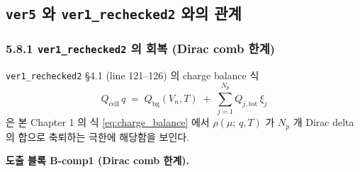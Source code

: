 \documentclass[11pt,a4paper]{article}
\newcommand{\tot}{\mathrm{tot}}
\newcommand{\bg}{\mathrm{bg}}
\newcommand{\cell}{\mathrm{cell}}
\newcommand{\mucont}{\mu}
\newcommand{\rhomu}{\rho(\mucont;\, q, T)}
\begin{document}
\subsection{\texttt{ver5} 와 \texttt{ver1\_rechecked2} 와의 관계}
\label{sec:legacy_comparison}

\subsubsection*{5.8.1 \texttt{ver1\_rechecked2} 의 회복 (Dirac comb 한계)}

\texttt{ver1\_rechecked2} \S 4.1 (line 121--126) 의 charge balance 식
\begin{equation}
Q_{\cell}\, q
\;=\;
Q_{\bg}(V_n, T)
\;+\;
\sum_{j=1}^{N_p} Q_{j,\tot}\, \xi_j
\label{eq:rechecked2_cb}
\end{equation}
은 본 Chapter 1 의 식 \eqref{eq:charge_balance} 에서 $\rhomu$ 가 $N_p$ 개 Dirac
delta 의 합으로 축퇴하는 극한에 해당함을 보인다.

\textbf{도출 블록 B-comp1 (Dirac comb 한계).}
\end{document}
